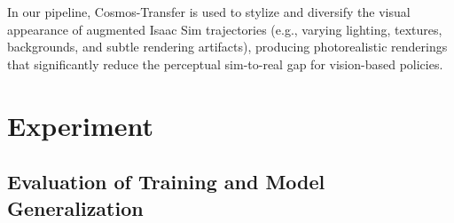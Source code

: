 \documentclass{article} %
\begin{document}
In our pipeline, Cosmos-Transfer is used to stylize and diversify the visual appearance of augmented Isaac Sim trajectories (e.g., varying lighting, textures, backgrounds, and subtle rendering artifacts), producing photorealistic renderings that significantly reduce the perceptual sim-to-real gap for vision-based policies.


\section{Experiment}
\subsection{Evaluation of Training and Model Generalization}
\end{document}
